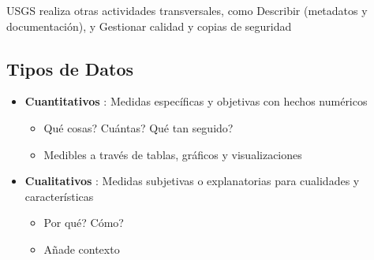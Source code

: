 {\footnotesize {USGS realiza otras actividades transversales, como Describir (metadatos y documentación), y Gestionar calidad y copias de seguridad}}

\subsection{Tipos de Datos}
\begin{itemize}
    \item {\textbf{Cuantitativos} : Medidas específicas y objetivas con hechos numéricos
    \begin{itemize}
        \item {Qué cosas? Cuántas? Qué tan seguido?}
        \item {Medibles a través de tablas, gráficos y visualizaciones}
    \end{itemize}}
    \item {\textbf{Cualitativos} : Medidas subjetivas o explanatorias para cualidades y características
    \begin{itemize}
        \item {Por qué? Cómo?}
        \item {Añade contexto}
    \end{itemize}}
\end{itemize}

\newpage

